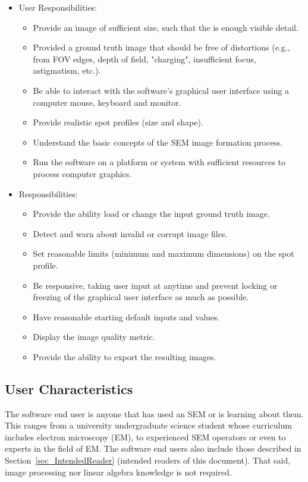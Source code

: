 \documentclass[12pt]{article}
\begin{document}
\begin{itemize}

  \item User Responsibilities:
  \begin{itemize}
    \item Provide an image of sufficient size, such that the is enough visible detail.
    \item Provided a ground truth image that should be free of distortions (e.g., from FOV edges, depth of field, "charging", insufficient focus, astigmatism, etc.).
    \item Be able to interact with the software's graphical user interface using a computer mouse, keyboard and monitor.
    \item Provide realistic spot profiles (size and shape).
    \item Understand the basic concepts of the SEM image formation process.
    \item Run the software on a platform or system with sufficient resources to process computer graphics.
  \end{itemize}

  \item \progname{} Responsibilities:
  \begin{itemize}
    \item Provide the ability load or change the input ground truth image.
    \item Detect and warn about invalid or corrupt image files.
    \item Set reasonable limits (minimum and maximum dimensions) on the spot profile. 
    \item Be responsive, taking user input at anytime and prevent locking or freezing of the graphical user interface as much as possible.
    \item Have reasonable starting default inputs and values.
    \item Display the image quality metric.
    \item Provide the ability to export the resulting images.
  \end{itemize}

\end{itemize}

\subsection{User Characteristics} \label{SecUserCharacteristics}

The \progname{} software end user is anyone that has used an SEM or is learning about them. 
This ranges from a university undergraduate science student whose curriculum includes 
electron microscopy (EM), to experienced SEM operators or even to experts in the field of EM. 
The software end users also include those described in Section~\ref{sec_IntendedReader} 
(intended readers of this document). That said, image processing nor linear algebra knowledge 
is not required. 
\end{document}
